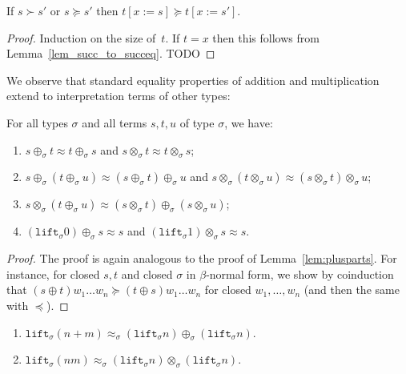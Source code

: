 \documentclass[runningheads,a4paper]{llncs}
\newcommand{\subst}[2]{#1:=#2}
\newcommand{\lift}{\mathtt{lift}}
\begin{document}
\begin{lemma}\label{lem_succeq_subst}
  If $s \succ s'$ or $s \succeq s'$ then $t[\subst{x}{s}] \succeq
  t[\subst{x}{s'}]$.
\end{lemma}

\begin{proof}
  Induction on the size of~$t$. If $t = x$ then this follows from
  Lemma~\ref{lem_succ_to_succeq}. TODO
\end{proof}

We observe that standard equality properties of addition and
multiplication extend to interpretation terms of other types:

\begin{lemma}\label{lem:approxproperties}
For all types $\sigma$ and all terms $s,t,u$ of type $\sigma$, we
have:
\begin{enumerate}
\item\label{lem:approx:symmetry}
  $s \oplus_\sigma t \approx t \oplus_\sigma s$ and
  $s \otimes_\sigma t \approx t \otimes_\sigma s$;
\item\label{lem:approx:assoc} $s \oplus_\sigma (t \oplus_\sigma u)
  \approx (s \oplus_\sigma t) \oplus_\sigma u$ and $s
  \otimes_\sigma (t \otimes_\sigma u) \approx (s \otimes_\sigma t) \otimes_\sigma u$;
\item\label{lem:approx:distribution} $s \otimes_\sigma (t \oplus_\sigma u)
  \approx (s \otimes_\sigma t) \oplus_\sigma (s \otimes_\sigma u)$;
\item\label{lem:approx:neutral} $(\lift_\sigma 0) \oplus_\sigma s
  \approx s$ and $(\lift_\sigma 1) \otimes_\sigma s \approx s$.
\end{enumerate}
\end{lemma}

\begin{proof}
  The proof is again analogous to the proof of
  Lemma~\ref{lem:plusparts}. For instance, for closed $s,t$ and closed
  $\sigma$ in $\beta$-normal form, we show by coinduction that $(s
  \oplus t) w_1 \ldots w_n \succeq (t \oplus s) w_1 \ldots w_n$ for
  closed $w_1,\ldots,w_n$ (and then the same with $\preceq$).
\end{proof}

\begin{lemma}
  \begin{enumerate}
  \item $\lift_\sigma(n+m) \approx_\sigma (\lift_\sigma n)
    \oplus_\sigma (\lift_\sigma n)$.
  \item $\lift_\sigma(n m) \approx_\sigma (\lift_\sigma n)
    \otimes_\sigma (\lift_\sigma n)$.
  \end{enumerate}
\end{lemma}
\end{document}
